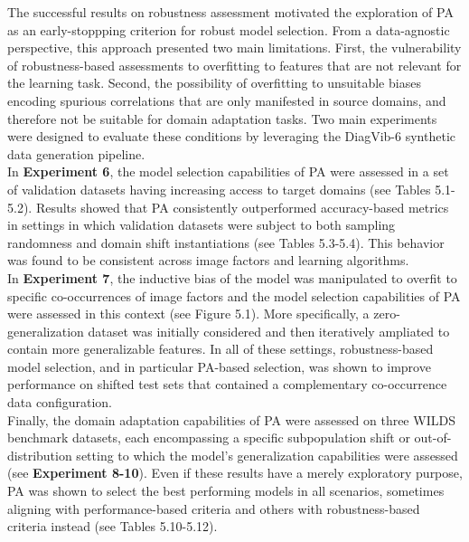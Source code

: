 
The successful results on robustness assessment motivated the exploration of PA as an early-stoppping
criterion for robust model selection. From a data-agnostic perspective, this approach presented two main limitations. 
First, the vulnerability of robustness-based assessments to overfitting to features that are not relevant
for the learning task. Second, the possibility of overfitting to unsuitable biases encoding spurious correlations
that are only manifested in source domains, and therefore not be suitable for domain adaptation tasks. 
Two main experiments were designed to evaluate these conditions by leveraging the DiagVib-6 synthetic
data generation pipeline.\\

In \textbf{Experiment 6}, the model selection capabilities of PA were assessed in a set of validation datasets
having increasing access to target domains (see Tables 5.1-5.2). Results showed that PA 
consistently outperformed accuracy-based metrics in settings in which validation datasets were subject to both sampling
randomness and domain shift instantiations (see Tables 5.3-5.4). This behavior was found to be consistent
across image factors and learning algorithms. \\

In \textbf{Experiment 7}, the inductive bias of the model was manipulated to overfit to specific co-occurrences of
image factors and the model selection capabilities of PA were assessed in this context (see Figure 5.1). More specifically, 
a zero-generalization dataset was initially considered and then iteratively ampliated to contain more generalizable 
features. In all of these settings, robustness-based model selection, and in particular PA-based selection, was shown to
improve performance on shifted test sets that contained a complementary co-occurrence data configuration. \\

Finally, the domain adaptation capabilities of PA were assessed on three WILDS benchmark datasets, each encompassing
a specific subpopulation shift or out-of-distribution setting to which the model's generalization capabilities were
assessed (see \textbf{Experiment 8-10}). Even if these results have a merely exploratory purpose,
PA was shown to select the best performing models in all scenarios, sometimes aligning with performance-based criteria
and others with robustness-based criteria instead (see Tables 5.10-5.12). \\

